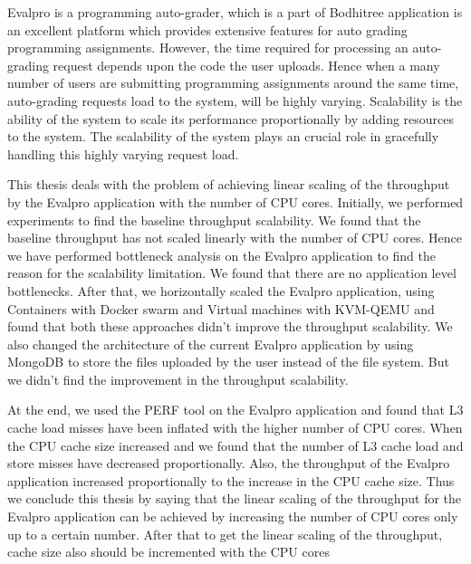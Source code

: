 \begin{Abstract}
Evalpro is a programming auto-grader, which is a part of Bodhitree application \cite{bodhi_tree} is an excellent platform which provides extensive features for auto grading programming assignments. However, the time required for processing an auto-grading request depends upon the code the user uploads. Hence when a many number of users are submitting programming assignments around the same time, auto-grading requests load to the system, will be highly varying. Scalability is the ability of the system to scale its performance proportionally by adding resources to the system. The scalability of the system plays an crucial role in gracefully handling this highly varying request load.

This thesis deals with the problem of achieving linear scaling of the throughput by the Evalpro application with the number of CPU cores. Initially, we performed experiments to find the baseline throughput scalability. We found that the baseline throughput has not scaled linearly with the number of CPU cores. Hence we have performed bottleneck analysis on the Evalpro application to find the reason for the scalability limitation. We found that there are no application level bottlenecks. After that, we horizontally scaled the Evalpro application, using Containers with Docker swarm \cite{docker_swarm} and Virtual machines with KVM-QEMU \cite{kvm_qemu} and found that both these approaches didn't improve the throughput scalability. We also changed the architecture of the current Evalpro application by using MongoDB \cite{mongo_db} to store the files uploaded by the user instead of the file system. But we didn't find the improvement in the throughput scalability.

At the end, we used the PERF tool \cite{PERF}  on the Evalpro application and found that L3 cache load misses have been inflated  with the higher number of CPU cores. When the CPU cache size increased and we found that the number of  L3 cache load and store misses have decreased proportionally. Also, the throughput of the Evalpro application increased proportionally to the increase in the CPU cache size. Thus we conclude this thesis by saying that the linear scaling of the throughput for the Evalpro application can be achieved by increasing the number of CPU cores only up to a certain number. After that to get the linear scaling of the throughput, cache size also should be incremented with the CPU cores


\end{Abstract}

